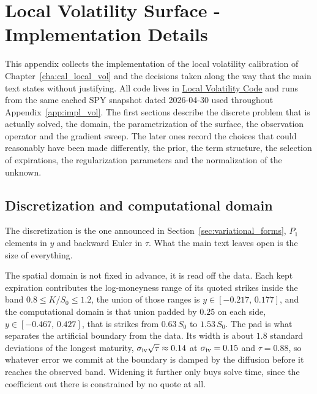 
\chapter{Local Volatility Surface - Implementation Details}
\label{app:local_vol}


This appendix collects the implementation of the local volatility calibration of
Chapter~\ref{cha:cal_local_vol} and the decisions taken along the way that the main text
states without justifying.
All code lives in \href{https://github.com/M315/TFM/tree/main/scripts/local_vol_egger/}{Local Volatility Code}
and runs from the same cached SPY snapshot dated 2026-04-30
used throughout Appendix~\ref{app:impl_vol}.
The first sections describe the discrete problem that is actually solved, the domain, the
parametrization of the surface, the observation operator and the gradient sweep.
The later ones record the choices that could reasonably have been made differently, the prior,
the term structure, the selection of expirations, the regularization parameters and the
normalization of the unknown.

\section{Discretization and computational domain}
\label{subsec:discretization_details}

The discretization is the one announced in Section~\ref{sec:variational_forms}, $P_1$ elements
in $y$ and backward Euler in $\tau$. What the main text leaves open is the size of everything.

The spatial domain is not fixed in advance, it is read off the data. Each kept expiration
contributes the log-moneyness range of its quoted strikes inside the band
$0.8 \le K/S_0 \le 1.2$, the union of those ranges is $y \in [-0.217,\,0.177]$, and the
computational domain is that union padded by $0.25$ on each side,
$y \in [-0.467,\,0.427]$, that is strikes from $0.63\,S_0$ to $1.53\,S_0$.
The pad is what separates the artificial boundary from the data.
Its width is about $1.8$ standard deviations of the longest maturity,
$\sigma_{\mathrm{iv}}\sqrt{\tau} \approx 0.14$ at $\sigma_{\mathrm{iv}} = 0.15$ and $\tau = 0.88$,
so whatever error we commit at the boundary is damped by the diffusion before it reaches the
observed band. Widening it further only buys solve time, since the coefficient out there is
constrained by no quote at all.

